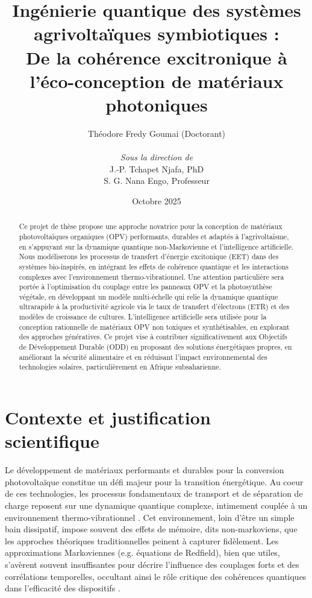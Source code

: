 \documentclass[12pt, a4paper]{article}
\title{\huge Ingénierie quantique des systèmes agrivoltaïques symbiotiques :\\ De la cohérence excitronique à l'éco-conception de matériaux photoniques}
\author{
    Théodore Fredy Goumai (Doctorant) \\
    \\
    \textit{Sous la direction de} \\
    J.-P. Tchapet Njafa, PhD \\
    S. G. Nana Engo, Professeur
}
\date{Octobre 2025}
\begin{document}
\maketitle
\thispagestyle{empty} %
\newpage

\begin{abstract}
Ce projet de thèse propose une approche novatrice pour la conception de matériaux photovoltaïques organiques (OPV) performants, durables et adaptés à l'agrivoltaïsme, en s'appuyant sur la dynamique quantique non-Markovienne et l'intelligence artificielle. Nous modéliserons les processus de transfert d'énergie excitonique (EET) dans des systèmes bio-inspirés, en intégrant les effets de cohérence quantique et les interactions complexes avec l'environnement thermo-vibrationnel. Une attention particulière sera portée à l'optimisation du couplage entre les panneaux OPV et la photosynthèse végétale, en développant un modèle multi-échelle qui relie la dynamique quantique ultrarapide à la productivité agricole via le taux de transfert d'électrons (ETR) et des modèles de croissance de cultures. L'intelligence artificielle sera utilisée pour la conception rationnelle de matériaux OPV non toxiques et synthétisables, en explorant des approches génératives. Ce projet vise à contribuer significativement aux Objectifs de Développement Durable (ODD) en proposant des solutions énergétiques propres, en améliorant la sécurité alimentaire et en réduisant l'impact environnemental des technologies solaires, particulièrement en Afrique subsaharienne.
\end{abstract}
\newpage

\tableofcontents %
\newpage
\setcounter{page}{1} %



\section{Contexte et justification scientifique}

Le développement de matériaux performants et durables pour la conversion photovoltaïque constitue un défi majeur pour la transition énergétique. Au coeur de ces technologies, les processus fondamentaux de transport et de séparation de charge reposent sur une dynamique quantique complexe, intimement couplée à un environnement thermo-vibrationnel \cite{ye2012, mohs2008}. Cet environnement, loin d'être un simple bain dissipatif, impose souvent des effets de mémoire, dits non-markoviens, que les approches théoriques traditionnelles peinent à capturer fidèlement. Les approximations Markoviennes (e.g. équations de Redfield), bien que utiles, s'avèrent souvent insuffisantes pour décrire l'influence des couplages forts et des corrélations temporelles, occultant ainsi le rôle critique des cohérences quantiques dans l'efficacité des dispositifs \cite{tao2020, dijkstra2010}.
\end{document}
